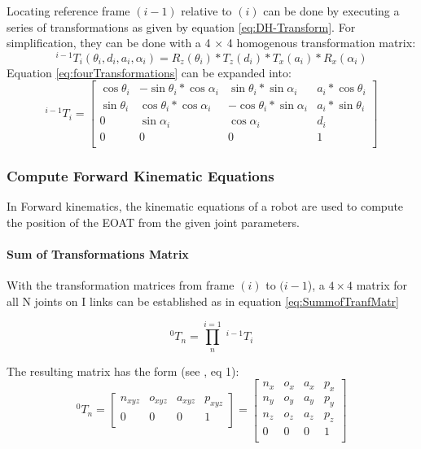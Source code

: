 Locating reference frame $(i-1)$ relative to $(i)$ can be done by executing a series of transformations as given by equation \ref{eq:DH-Transform}. 
For simplification, they can be done with a 4 × 4 homogenous transformation matrix:
\begin{equation} \label{eq:fourTransformations}
^{i-1}T_i(\theta_i,d_i,a_i,\alpha_i)=R_z(\theta_i)*T_z(d_i)*T_x(a_i)*R_x(\alpha_i)
\end{equation}
Equation \ref{eq:fourTransformations} can be expanded into:
\begin{equation}\label{eq:TransformationMarix}
^{i-1}T_i=
\begin{bmatrix}
\cos\theta_i & -\sin\theta_i*\cos\alpha_i & \sin\theta_i*\sin\alpha_i & a_i*\cos\theta_i \\
\sin\theta_i & \cos\theta_i*\cos\alpha_i & -\cos\theta_i*\sin\alpha_i & a_i*\sin\theta_i \\ %
0 & \sin\alpha_i & \cos\alpha_i & d_i \\
0 & 0 & 0 & 1 \\
\end{bmatrix}
\end{equation}



\subsubsection{Compute Forward Kinematic Equations} \label{ForKinEq}
In Forward kinematics, the kinematic equations of a robot are used to compute the position of the \ac{EOAT} from the given joint parameters.

\paragraph{Sum of Transformations Matrix}
With the transformation matrices from frame $(i)$ to $(i-1$), a $4\times4$ matrix for all \gls{N} joints on \gls{I} links can be established as in equation \ref{eq:SummofTranfMatr}

\begin{equation} \label{eq:SummofTranfMatr}
^0T_n=\prod_{n}^{i=1} \phantom{.}^{i-1}T_i
\end{equation}


The resulting matrix has the form (see \cite{invKinSolYanWu}, eq 1):
\begin{equation}\label{eq:matrixForm}
^0T_n=
\begin{bmatrix}
n_{xyz} & o_{xyz} & a_{xyz} & p_{xyz} \\
0 & 0 & 0 & 1 \\
\end{bmatrix}
=
\begin{bmatrix}
n_x & o_x & a_x & p_x \\
n_y & o_y & a_y & p_y \\ %
n_z & o_z & a_z & p_z \\
0 & 0 & 0 & 1 \\
\end{bmatrix}
\end{equation}

